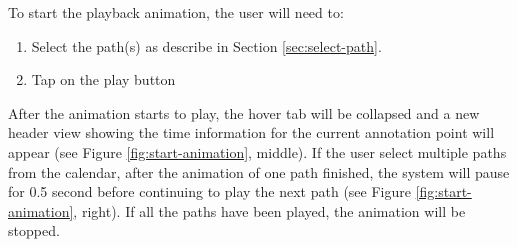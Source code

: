 \documentclass[12pt,a4paper]{article}
\begin{document}
                To start the playback animation, the user will need to:
                \begin{enumerate}
                    \item Select the path(s) as describe in Section \ref{sec:select-path}.
                    \item Tap on the play button
                \end{enumerate}
                
                After the animation starts to play, the hover tab will be collapsed and a new header view showing the time information for the current annotation point will appear (see Figure \ref{fig:start-animation}, middle). If the user select multiple paths from the calendar, after the animation of one path finished, the system will pause for 0.5 second before continuing to play the next path (see Figure \ref{fig:start-animation}, right). If all the paths have been played, the animation will be stopped.
                
\end{document}
